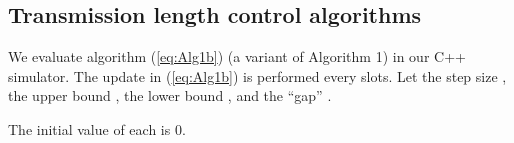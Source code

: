 \documentclass{IEEEtran}
\begin{document}
\subsection{\label{sub:sim_alg}Transmission length control algorithms}

We evaluate algorithm (\ref{eq:Alg1b}) (a variant of Algorithm 1)
in our C++ simulator. The update in (\ref{eq:Alg1b}) is performed
every  slots. Let the step size ,
the upper bound , the lower bound , and
the {}``gap'' . \begin{comment}
Since  is in general not an integer,
link  chooses its payload length to be 
with probability 
and  with probability .
(Thus link 's mean payload length is , leading to
the desired average throughput.)
\end{comment}
{} The initial value of each  is 0. 
\end{document}
